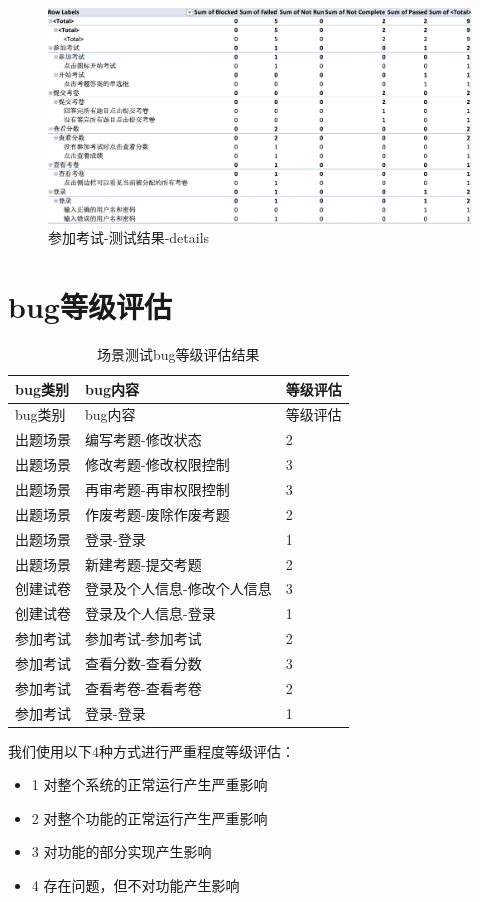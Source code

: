 \documentclass[hyperref, a4paper]{ctexart}
\providecommand{\tightlist}{%
  \setlength{\itemsep}{0pt}\setlength{\parskip}{0pt}}
\begin{document}
\begin{figure}
\centering
\includegraphics{screenshoots/PivotTable_Details_3.png}
\caption{参加考试-测试结果-details}
\end{figure}

\hypertarget{bugux7b49ux7ea7ux8bc4ux4f30}{%
\section{bug等级评估}\label{bugux7b49ux7ea7ux8bc4ux4f30}}

\begin{longtable}[]{@{}lll@{}}
\caption{场景测试bug等级评估结果}\tabularnewline
\toprule
bug类别 & bug内容 & 等级评估\tabularnewline
\midrule
\endfirsthead
\toprule
bug类别 & bug内容 & 等级评估\tabularnewline
\midrule
\endhead
出题场景 & 编写考题-修改状态 & 2\tabularnewline
出题场景 & 修改考题-修改权限控制 & 3\tabularnewline
出题场景 & 再审考题-再审权限控制 & 3\tabularnewline
出题场景 & 作废考题-废除作废考题 & 2\tabularnewline
出题场景 & 登录-登录 & 1\tabularnewline
出题场景 & 新建考题-提交考题 & 2\tabularnewline
创建试卷 & 登录及个人信息-修改个人信息 & 3\tabularnewline
创建试卷 & 登录及个人信息-登录 & 1\tabularnewline
参加考试 & 参加考试-参加考试 & 2\tabularnewline
参加考试 & 查看分数-查看分数 & 3\tabularnewline
参加考试 & 查看考卷-查看考卷 & 2\tabularnewline
参加考试 & 登录-登录 & 1\tabularnewline
\bottomrule
\end{longtable}

我们使用以下4种方式进行严重程度等级评估：

\begin{itemize}
\tightlist
\item
  1 对整个系统的正常运行产生严重影响
\item
  2 对整个功能的正常运行产生严重影响
\item
  3 对功能的部分实现产生影响
\item
  4 存在问题，但不对功能产生影响
\end{itemize}
\end{document}
